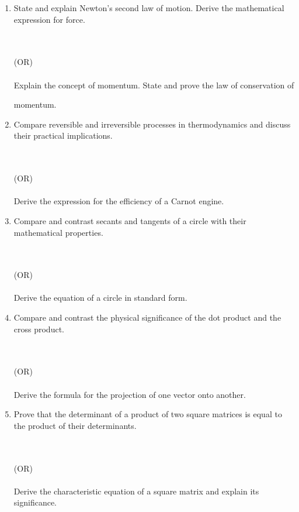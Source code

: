 \documentclass[a4paper,12pt]{article}
\begin{document}
\begin{enumerate}
    \item State and explain Newton’s second law of motion. Derive the mathematical expression 
for force. 

\\\\(OR)\\\\

 Explain the concept of momentum. State and prove the law of conservation of 

momentum.
    \item Compare reversible and irreversible processes in thermodynamics and discuss their 
practical implications. 

\\\\(OR)\\\\

 Derive the expression for the efficiency of a Carnot engine.
    \item Compare and contrast secants and tangents of a circle with their mathematical 
properties. 

\\\\(OR)\\\\

 Derive the equation of a circle in standard form.
    \item Compare and contrast the physical significance of the dot product and the cross 
product. 

\\\\(OR)\\\\

 Derive the formula for the projection of one vector onto another.
    \item Prove that the determinant of a product of two square matrices is equal to the product of 
their determinants. 

\\\\(OR)\\\\

 Derive the characteristic equation of a square matrix and explain its significance.
\end{enumerate}
\end{document}
